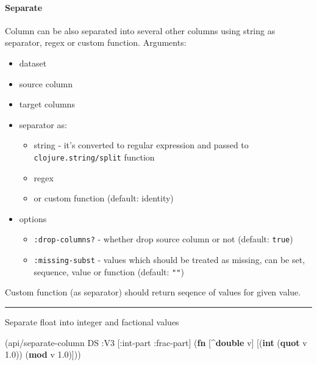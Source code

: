 \documentclass[]{article}
\newenvironment{Shaded}{\begin{snugshade}}{\end{snugshade}}
\newcommand{\KeywordTok}[1]{\textcolor[rgb]{0.13,0.29,0.53}{\textbf{#1}}}
\newcommand{\FloatTok}[1]{\textcolor[rgb]{0.00,0.00,0.81}{#1}}
\newcommand{\AttributeTok}[1]{\textcolor[rgb]{0.77,0.63,0.00}{#1}}
\newcommand{\NormalTok}[1]{#1}
\providecommand{\tightlist}{%
  \setlength{\itemsep}{0pt}\setlength{\parskip}{0pt}}
\let\oldparagraph\paragraph
\renewcommand{\paragraph}[1]{\oldparagraph{#1}\mbox{}}
\begin{document}
\paragraph{Separate}\label{separate}

Column can be also separated into several other columns using string as
separator, regex or custom function. Arguments:

\begin{itemize}
\tightlist
\item
  dataset
\item
  source column
\item
  target columns
\item
  separator as:

  \begin{itemize}
  \tightlist
  \item
    string - it's converted to regular expression and passed to
    \texttt{clojure.string/split} function
  \item
    regex
  \item
    or custom function (default: identity)
  \end{itemize}
\item
  options

  \begin{itemize}
  \tightlist
  \item
    \texttt{:drop-columns?} - whether drop source column or not
    (default: \texttt{true})
  \item
    \texttt{:missing-subst} - values which should be treated as missing,
    can be set, sequence, value or function (default: \texttt{""})
  \end{itemize}
\end{itemize}

Custom function (as separator) should return seqence of values for given
value.

\begin{center}\rule{0.5\linewidth}{0.5pt}\end{center}

Separate float into integer and factional values

\begin{Shaded}
\begin{Highlighting}[]
\NormalTok{(api/separate-column DS }\AttributeTok{:V3}\NormalTok{ [}\AttributeTok{:int-part} \AttributeTok{:frac-part}\NormalTok{] (}\KeywordTok{fn}\NormalTok{ [^}\KeywordTok{double}\NormalTok{ v]}
\NormalTok{                                                     [(}\KeywordTok{int}\NormalTok{ (}\KeywordTok{quot}\NormalTok{ v }\FloatTok{1.0}\NormalTok{))}
\NormalTok{                                                      (}\KeywordTok{mod}\NormalTok{ v }\FloatTok{1.0}\NormalTok{)]))}
\end{Highlighting}
\end{Shaded}
\end{document}
